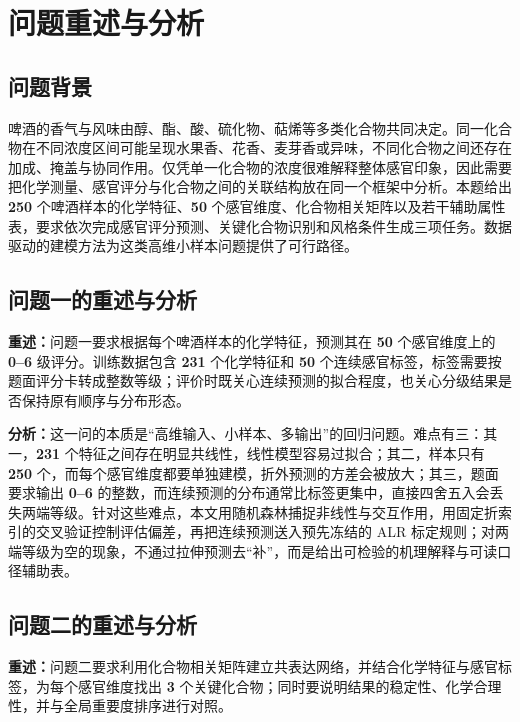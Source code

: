 \section{问题重述与分析}

\subsection{问题背景}

啤酒的香气与风味由醇、酯、酸、硫化物、萜烯等多类化合物共同决定。同一化合物在不同浓度区间可能呈现水果香、花香、麦芽香或异味，不同化合物之间还存在加成、掩盖与协同作用。仅凭单一化合物的浓度很难解释整体感官印象，因此需要把化学测量、感官评分与化合物之间的关联结构放在同一个框架中分析\cite{jiang2018}。本题给出 \textbf{250} 个啤酒样本的化学特征、\textbf{50} 个感官维度、化合物相关矩阵以及若干辅助属性表，要求依次完成感官评分预测、关键化合物识别和风格条件生成三项任务。数据驱动的建模方法为这类高维小样本问题提供了可行路径\cite{zhang2020}。

\subsection{问题一的重述与分析}

\textbf{重述：}问题一要求根据每个啤酒样本的化学特征，预测其在 \textbf{50} 个感官维度上的 \textbf{0--6} 级评分。训练数据包含 \textbf{231} 个化学特征和 \textbf{50} 个连续感官标签，标签需要按题面评分卡转成整数等级；评价时既关心连续预测的拟合程度，也关心分级结果是否保持原有顺序与分布形态。

\textbf{分析：}这一问的本质是“高维输入、小样本、多输出”的回归问题。难点有三：其一，\textbf{231} 个特征之间存在明显共线性，线性模型容易过拟合；其二，样本只有 \textbf{250} 个，而每个感官维度都要单独建模，折外预测的方差会被放大；其三，题面要求输出 \textbf{0--6} 的整数，而连续预测的分布通常比标签更集中，直接四舍五入会丢失两端等级。针对这些难点，本文用随机森林捕捉非线性与交互作用\cite{breiman2001}，用固定折索引的交叉验证控制评估偏差\cite{li2019}，再把连续预测送入预先冻结的 ALR 标定规则；对两端等级为空的现象，不通过拉伸预测去“补”，而是给出可检验的机理解释与可读口径辅助表。

\subsection{问题二的重述与分析}

\textbf{重述：}问题二要求利用化合物相关矩阵建立共表达网络，并结合化学特征与感官标签，为每个感官维度找出 \textbf{3} 个关键化合物；同时要说明结果的稳定性、化学合理性，并与全局重要度排序进行对照。


